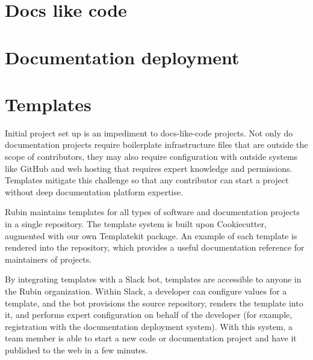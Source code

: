 \documentclass[11pt,twoside]{article}
\begin{document}

\section{Docs like code}


\section{Documentation deployment}


\section{Templates}

Initial project set up is an impediment to docs-like-code projects.
Not only do documentation projects require boilerplate infrastructure files that are outside the scope of contributors, they may also require configuration with outside systems like GitHub and web hosting that requires expert knowledge and permissions.
Templates mitigate this challenge so that any contributor can start a project without deep documentation platform expertise.

Rubin maintains templates for all types of software and documentation projects in a single repository.
The template system is built upon Cookiecutter, augmented with our own Templatekit package.
An example of each template is rendered into the repository, which provides a useful documentation reference for maintainers of projects.

By integrating templates with a Slack bot, templates are accessible to anyone in the Rubin organization.
Within Slack, a developer can configure values for a template, and the bot provisions the source repository, renders the template into it, and performs expert configuration on behalf of the developer (for example, registration with the documentation deployment system).
With this system, a team member is able to start a new code or documentation project and have it published to the web in a few minutes.
\end{document}

